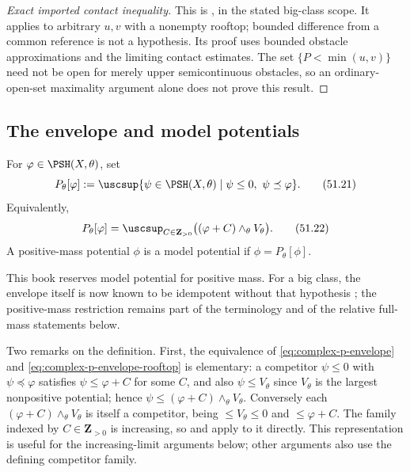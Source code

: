 \begin{proof}[Exact imported contact inequality]
This is \cite[Lemma~3.7]{DDNL18mono}, in the stated big-class scope.
It applies to arbitrary $u,v$ with a nonempty rooftop; bounded difference
from a common reference is not a hypothesis.  Its proof uses bounded
obstacle approximations and the limiting contact estimates.  The set
$\{P<\min(u,v)\}$ need not be open for merely upper semicontinuous
obstacles, so an ordinary-open-set maximality argument alone does not
prove this result.
\end{proof}

\subsection{The envelope and model potentials}
\label{sec:ch51-p-envelope-def}

\begin{definition}
\label{def:complex-p-envelope}
For $\varphi\in\PSH(X,\theta)$, set
\[
 P_\theta[\varphi]
 :=\uscsup\{\psi\in\PSH(X,\theta)\mid
              \psi\leq0,\ \psi\preceq\varphi\}.
\tag{51.21}\label{eq:complex-p-envelope}
\]
Equivalently,
\[
 P_\theta[\varphi]
 =\uscsup_{C\in\mathbf Z_{>0}}
       \bigl((\varphi+C)\wedge_\theta V_\theta\bigr).
\tag{51.22}\label{eq:complex-p-envelope-rooftop}
\]
A positive-mass potential $\phi$ is a model potential if
$\phi=P_\theta[\phi]$.
\end{definition}

This book reserves model potential for positive mass.  For a big class,
the envelope itself is now known to be idempotent without that hypothesis
\cite[Theorem~1.2]{PSWZ26}; the positive-mass restriction remains part of
the terminology and of the relative full-mass statements below.

Two remarks on the definition.  First, the equivalence of
\eqref{eq:complex-p-envelope} and
\eqref{eq:complex-p-envelope-rooftop} is elementary: a competitor
$\psi\leq0$ with $\psi\preceq\varphi$ satisfies $\psi\leq\varphi+C$
for some $C$, and also $\psi\leq V_\theta$ since
$V_\theta$ is the largest nonpositive potential; hence
$\psi\leq(\varphi+C)\wedge_\theta V_\theta$.  Conversely each
$(\varphi+C)\wedge_\theta V_\theta$ is itself a competitor, being
$\leq V_\theta\leq0$ and $\leq\varphi+C$.  The family indexed by
$C\in\mathbf Z_{>0}$ is increasing, so
 and
 apply to it directly.  This
representation is useful for the increasing-limit arguments below; other
arguments also use the defining competitor family.

